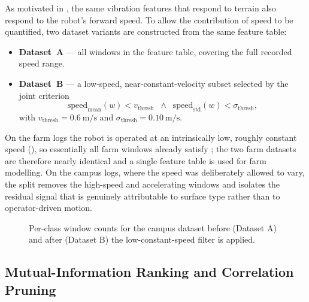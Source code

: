 As motivated in , the same vibration features that respond to terrain also respond to the robot's forward speed. To allow the contribution of speed to be quantified, two dataset variants are constructed from the same feature table:
\begin{itemize}
    \item \textbf{Dataset~A} --- all windows in the feature table, covering the full recorded speed range.
    \item \textbf{Dataset~B} --- a low-speed, near-constant-velocity subset selected by the joint criterion
          \begin{equation}
              \mathrm{speed}_{\mathrm{mean}}(w) < v_{\mathrm{thresh}}
              \;\;\land\;\;
              \mathrm{speed}_{\mathrm{std}}(w) < \sigma_{\mathrm{thresh}},
              \label{eq:dataset_B_mask}
          \end{equation}
          with $v_{\mathrm{thresh}} = \SI{0.6}{\meter\per\second}$ and $\sigma_{\mathrm{thresh}} = \SI{0.10}{\meter\per\second}$.
\end{itemize}
On the farm logs the robot is operated at an intrinsically low, roughly constant speed (), so essentially all farm windows already satisfy ; the two farm datasets are therefore nearly identical and a single feature table is used for farm modelling. On the campus logs, where the speed was deliberately allowed to vary, the split removes the high-speed and accelerating windows and isolates the residual signal that is genuinely attributable to surface type rather than to operator-driven motion.

\begin{figure}[H]
    \centering
    \caption{Per-class window counts for the campus dataset before
    (Dataset A) and after (Dataset B) the low-constant-speed filter
    is applied.}
    \label{fig:dataset_AB_counts}
\end{figure}

\subsection{Mutual-Information Ranking and Correlation Pruning}
\label{sec:feat_mi_pruning}

